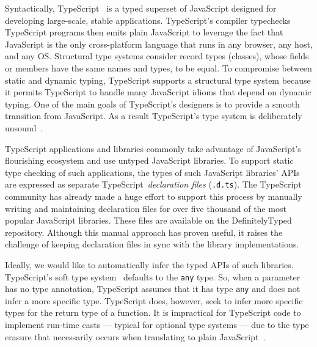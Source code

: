 \documentclass[sigplan,10pt,review,anonymous]{acmart} %
\newcommand{\margincomment}[2]{\marginpar{\scriptsize\color{Maroon}#1 says: #2}}
\newcommand{\adg}[1]{\margincomment{ADG}{#1}}
\theoremstyle{plain}
\theoremstyle{remark}
\theoremstyle{definition}
\begin{document}
Syntactically, TypeScript~\citep{typescript} is a typed superset of
JavaScript designed for developing large-scale, stable applications.
TypeScript's compiler typechecks TypeScript programs then emits plain JavaScript
to leverage the fact that JavaScript is the only cross-platform
language that runs in any browser, any host, and any OS.
Structural type systems consider record types (classes), whose fields or members have the same names and types, to be equal.
To compromise between static and dynamic typing, TypeScript supports a
structural type system because it permits TypeScript to handle many JavaScript idioms that depend on dynamic typing.
One of the main goals of TypeScript's designers is to
provide a smooth transition from JavaScript.
%
As a result TypeScript's type system is deliberately unsound~\citep{understandtypescript}.

TypeScript applications and libraries commonly take advantage of JavaScript's flourishing ecosystem
and use untyped JavaScript libraries.
To support static type checking of such applications,
the types of such JavaScript libraries' APIs are expressed
as separate TypeScript~\emph{declaration files} (\lstinline{.d.ts}).
The TypeScript community has already
made a huge effort to support this process by manually writing and maintaining
declaration files for over five thousand of the most popular JavaScript
libraries. These files are available on the DefinitelyTyped
\citep{definitelytyped} repository.
Although this manual approach has proven
useful, it raises the challenge of keeping declaration files
in sync with the library implementations.

Ideally, we would like to automatically infer the typed APIs of such
libraries.
TypeScript's soft type system~\citep{softtyping}
defaults to the \texttt{any} type.
So, when a parameter has no type annotation, TypeScript assumes that it has type
\texttt{any} and does not infer a more specific type.
%
TypeScript does, however, seek to infer more specific types for the return type of a function.
%
It is impractical for TypeScript code to implement run-time casts --- typical for optional type
systems --- due to the type erasure that necessarily occurs when translating to plain JavaScript~\citep{understandtypescript}.
\end{document}
